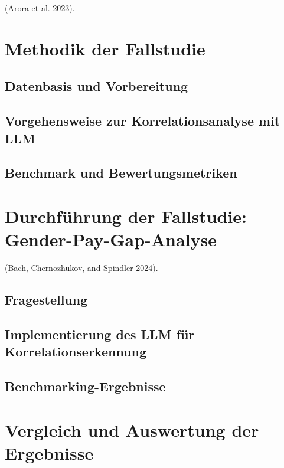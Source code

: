\documentclass[
  11pt,
]{article}
\begin{document}
(Arora et al. 2023).

\section{Methodik der Fallstudie}\label{methodik-der-fallstudie}

\subsection{Datenbasis und
Vorbereitung}\label{datenbasis-und-vorbereitung}

\subsection{Vorgehensweise zur Korrelationsanalyse mit
LLM}\label{vorgehensweise-zur-korrelationsanalyse-mit-llm}

\subsection{Benchmark und
Bewertungsmetriken}\label{benchmark-und-bewertungsmetriken}

\section{Durchführung der Fallstudie:
Gender-Pay-Gap-Analyse}\label{durchfuxfchrung-der-fallstudie-gender-pay-gap-analyse}

(Bach, Chernozhukov, and Spindler 2024).

\subsection{Fragestellung}\label{fragestellung}

\subsection{Implementierung des LLM für
Korrelationserkennung}\label{implementierung-des-llm-fuxfcr-korrelationserkennung}

\subsection{Benchmarking-Ergebnisse}\label{benchmarking-ergebnisse}

\section{Vergleich und Auswertung der
Ergebnisse}\label{vergleich-und-auswertung-der-ergebnisse}
\end{document}

